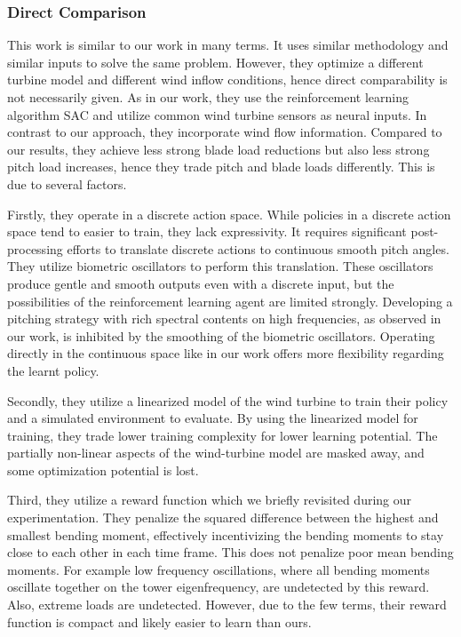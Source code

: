 \subsubsection{Direct Comparison}

This work is similar to our work in many terms. It uses similar methodology and similar inputs to solve the same problem. However, they optimize a different turbine model and different wind inflow conditions, hence direct comparability is not necessarily given.  As in our work, they use the reinforcement learning algorithm \ac{SAC} and utilize common wind turbine sensors as neural inputs. In contrast to our approach, they incorporate wind flow information. Compared to our results, they achieve less strong blade load reductions but also less strong pitch load increases, hence they trade pitch and blade loads differently. This is due to several factors.

Firstly, they operate in a discrete action space. While policies in a discrete action space tend to easier to train, they lack expressivity. It requires significant post-processing efforts to translate discrete actions to continuous smooth pitch angles. They utilize biometric oscillators to perform this translation. These oscillators produce gentle and smooth outputs even with a discrete input, but the possibilities of the reinforcement learning agent are limited strongly. Developing a pitching strategy with rich spectral contents on high frequencies, as observed in our work, is inhibited by the smoothing of the biometric oscillators. Operating directly in the continuous space like in our work offers more flexibility regarding the learnt policy. 

Secondly, they utilize a linearized model of the wind turbine to train their policy and a simulated environment to evaluate. By using the linearized model for training, they trade lower training complexity for lower learning potential. The partially non-linear aspects of the wind-turbine model are masked away, and some optimization potential is lost.

Third, they utilize a reward function which we briefly revisited during our experimentation. They penalize the squared difference between the highest and smallest bending moment, effectively incentivizing the bending moments to stay close to each other in each time frame. This does not penalize poor mean bending moments. For example low frequency oscillations, where all bending moments oscillate together on the tower eigenfrequency, are undetected by this reward. Also, extreme loads are undetected. However, due to the few terms, their reward function is compact and likely easier to learn than ours.

